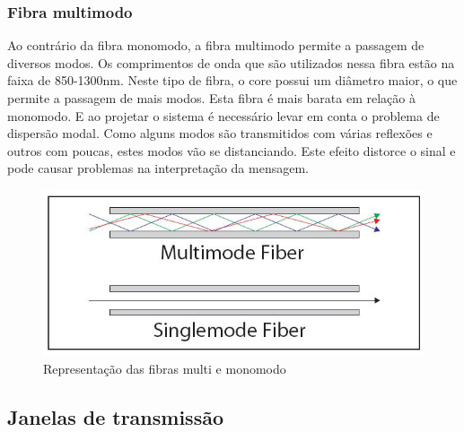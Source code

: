 \documentclass[article]{IEEEtran}
\begin{document}
\subsubsection{Fibra multimodo}
Ao contrário da fibra monomodo, a fibra multimodo permite a passagem de diversos modos. Os comprimentos de onda que são utilizados nessa fibra estão na faixa de 850-1300nm. Neste tipo de fibra, o core possui um diâmetro maior, o que permite a passagem de mais modos. Esta fibra é mais barata em relação à monomodo. E ao projetar o sistema é necessário levar em conta o problema de dispersão modal. Como alguns modos são transmitidos com várias reflexões e outros com poucas, estes modos vão se distanciando. Este efeito distorce o sinal e pode causar problemas na interpretação da mensagem.

\begin{figure}[h]
\includegraphics[width=\columnwidth]{mono-multi.jpg}
\caption{Representação das fibras multi e monomodo}
\end{figure}


\subsection{Janelas de transmissão}
\end{document}
